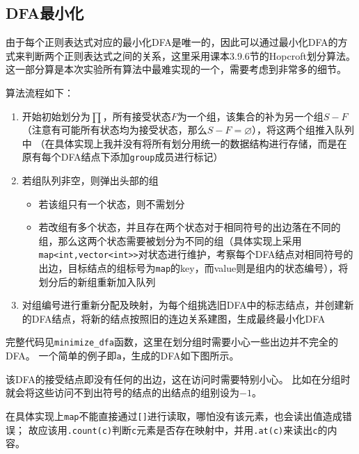 \documentclass[logo,reportComp]{thesis}
\begin{document}
\subsection{DFA最小化}
由于每个正则表达式对应的最小化DFA是唯一的，因此可以通过最小化DFA的方式来判断两个正则表达式之间的关系，这里采用课本3.9.6节的Hopcroft划分算法。
这一部分算是本次实验所有算法中最难实现的一个，需要考虑到非常多的细节。

算法流程如下：
\begin{enumerate}
	\item 开始初始划分为$\prod$，所有接受状态$F$为一个组，该集合的补为另一个组$S-F$（注意有可能所有状态均为接受状态，那么$S-F=\varnothing$），将这两个组推入队列中
	（在具体实现上我并没有将所有划分用统一的数据结构进行存储，而是在原有每个DFA结点下添加\verb'group'成员进行标记）
	\item 若组队列非空，则弹出头部的组
	\begin{itemize}
		\item 若该组只有一个状态，则不需划分
		\item 若改组有多个状态，并且存在两个状态对于相同符号的出边落在不同的组，那么这两个状态需要被划分为不同的组（具体实现上采用\verb'map<int,vector<int>>'对状态进行维护，考察每个DFA结点对相同符号的出边，目标结点的组标号为\verb'map'的key，而value则是组内的状态编号），将划分后的新组重新加入队列
	\end{itemize}
	\item 对组编号进行重新分配及映射，为每个组挑选旧DFA中的标志结点，并创建新的DFA结点，将新的结点按照旧的连边关系建图，生成最终最小化DFA
\end{enumerate}

完整代码见\verb'minimize_dfa'函数，这里在划分组时需要小心一些出边并不完全的DFA。
一个简单的例子即\verb'a'，生成的DFA如下图所示。
\begin{center}
\end{center}
该DFA的接受结点即没有任何的出边，这在访问时需要特别小心。
比如在分组时就会将这些访问不到出符号的结点的出结点的组别设为$-1$。

在具体实现上\verb'map'不能直接通过\verb'[]'进行读取，哪怕没有该元素，也会读出值造成错误；
故应该用\verb'.count(c)'判断\verb'c'元素是否存在映射中，并用\verb'.at(c)'来读出\verb'c'的内容。
\end{document}
